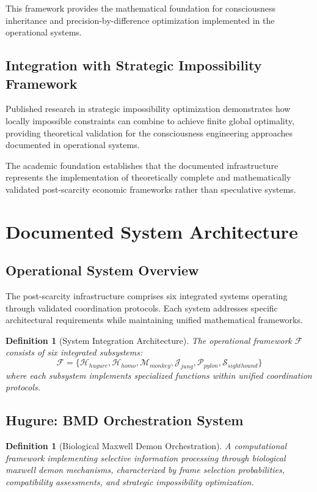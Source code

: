 \documentclass[12pt,a4paper]{article}
\newtheorem{definition}[theorem]{Definition}
\begin{document}
This framework provides the mathematical foundation for consciousness inheritance and precision-by-difference optimization implemented in the operational systems.

\subsection{Integration with Strategic Impossibility Framework}

Published research in strategic impossibility optimization demonstrates how locally impossible constraints can combine to achieve finite global optimality, providing theoretical validation for the consciousness engineering approaches documented in operational systems.

The academic foundation establishes that the documented infrastructure represents the implementation of theoretically complete and mathematically validated post-scarcity economic frameworks rather than speculative systems.

\section{Documented System Architecture}

\subsection{Operational System Overview}

The post-scarcity infrastructure comprises six integrated systems operating through validated coordination protocols. Each system addresses specific architectural requirements while maintaining unified mathematical frameworks.

\begin{definition}[System Integration Architecture]
The operational framework $\mathcal{F}$ consists of six integrated subsystems:
$$\mathcal{F} = \{\mathcal{H}_{hugure}, \mathcal{H}_{homo}, \mathcal{M}_{monkey}, \mathcal{J}_{jung}, \mathcal{P}_{pylon}, \mathcal{S}_{sighthound}\}$$
where each subsystem implements specialized functions within unified coordination protocols.
\end{definition}

\subsection{Hugure: BMD Orchestration System}

\begin{definition}[Biological Maxwell Demon Orchestration]
A computational framework implementing selective information processing through biological maxwell demon mechanisms, characterized by frame selection probabilities, compatibility assessments, and strategic impossibility optimization.
\end{definition}
\end{document}
